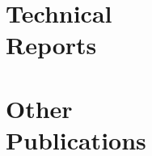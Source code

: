\documentclass[margin,line]{resume}
\begin{document}
\begin{resume}
    \section{\mysidestyle Technical\\Reports}
    \begin{bibenum}
        \item {}
    \end{bibenum}

    \section{\mysidestyle Other\\Publications}
    \begin{bibenum}
        \item {}
    \end{bibenum}

\end{resume}
\end{document}
